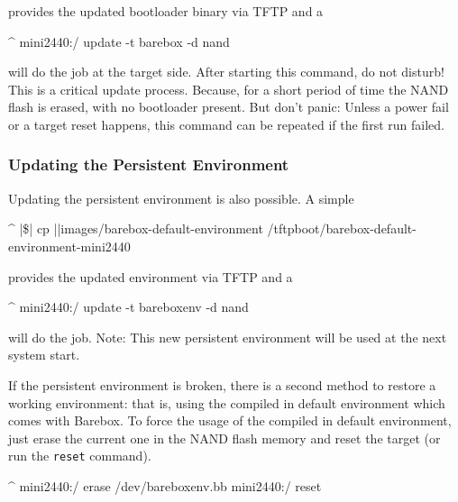 provides the updated bootloader binary via TFTP and a

\begin{ptxshell}[escapechar=|]{^}
mini2440:/ update -t barebox -d nand
\end{ptxshell}

will do the job at the target side. After starting this command, do not disturb!
This is a critical update process. Because, for a short period of time the
NAND flash is erased, with no bootloader present. But don't panic: Unless a
power fail or a target reset happens, this command can be repeated if the
first run failed.

\subsubsection{Updating the Persistent Environment}


Updating the persistent environment is also possible. A simple

\begin{ptxshell}[escapechar=|]{^}
|\$| cp |\ptxdistPlatformDir |images/barebox-default-environment /tftpboot/barebox-default-environment-mini2440
\end{ptxshell}

provides the updated environment via TFTP and a

\begin{ptxshell}[escapechar=|]{^}
mini2440:/ update -t bareboxenv -d nand
\end{ptxshell}

will do the job. Note: This new persistent environment will be used at the next
system start.

If the persistent environment is broken, there is a second method to restore a
working environment: that is, using the compiled in default environment which
comes with Barebox.
To force the usage of the compiled in default environment, just erase the
current one in the NAND flash memory and reset the target (or run the
\texttt{reset} command).

\begin{ptxshell}[escapechar=|]{^}
mini2440:/ erase /dev/bareboxenv.bb
mini2440:/ reset
\end{ptxshell}

